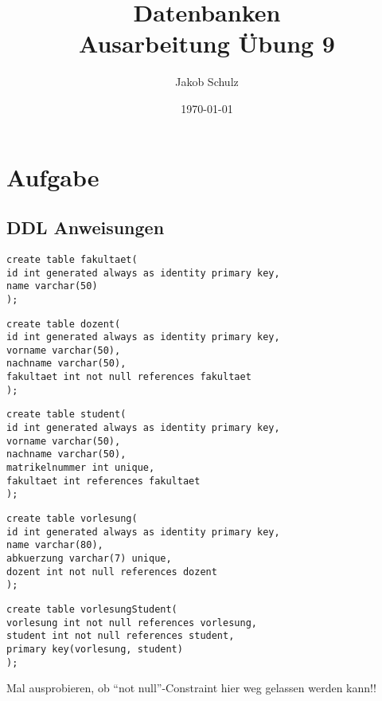 \documentclass[a4paper, 11pt, titlepage]{article}
\begin{document}
\title{Datenbanken \\
Ausarbeitung \"Ubung 9}

\author{Jakob Schulz}

\date{\today}

\maketitle{\thispagestyle{plain}}

\section{Aufgabe}
\subsection{DDL Anweisungen}
\begin{lstlisting}[style = sql]
create table fakultaet(
id int generated always as identity primary key,
name varchar(50)
);
\end{lstlisting}
\begin{lstlisting}[style = sql]
create table dozent(
id int generated always as identity primary key,
vorname varchar(50),
nachname varchar(50),
fakultaet int not null references fakultaet
);
\end{lstlisting}
\begin{lstlisting}[style = sql]
create table student(
id int generated always as identity primary key,
vorname varchar(50),
nachname varchar(50),
matrikelnummer int unique,
fakultaet int references fakultaet
);
\end{lstlisting}
\begin{lstlisting}[style = sql]
create table vorlesung(
id int generated always as identity primary key,
name varchar(80),
abkuerzung varchar(7) unique,
dozent int not null references dozent
);
\end{lstlisting}
\begin{lstlisting}[style = sql]
create table vorlesungStudent(
vorlesung int not null references vorlesung,
student int not null references student, 
primary key(vorlesung, student)
);
\end{lstlisting}
Mal ausprobieren, ob "`not null"'-Constraint hier weg gelassen werden kann!!
\newpage
\end{document}
